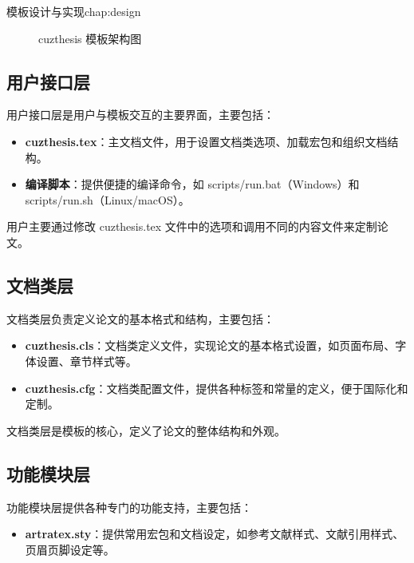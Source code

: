 \begin{cuzchapter}{模板设计与实现}{chap:design}
\begin{figure}[htbp]
        \caption{cuzthesis 模板架构图}
        \label{fig:architecture}
    \end{figure}

    \subsection{用户接口层}

    用户接口层是用户与模板交互的主要界面，主要包括：

    \begin{itemize}
        \item \textbf{cuzthesis.tex}：主文档文件，用于设置文档类选项、加载宏包和组织文档结构。

        \item \textbf{编译脚本}：提供便捷的编译命令，如 scripts/run.bat（Windows）和 scripts/run.sh（Linux/macOS）。
    \end{itemize}

    用户主要通过修改 cuzthesis.tex 文件中的选项和调用不同的内容文件来定制论文。

    \subsection{文档类层}

    文档类层负责定义论文的基本格式和结构，主要包括：

    \begin{itemize}
        \item \textbf{cuzthesis.cls}：文档类定义文件，实现论文的基本格式设置，如页面布局、字体设置、章节样式等。

        \item \textbf{cuzthesis.cfg}：文档类配置文件，提供各种标签和常量的定义，便于国际化和定制。
    \end{itemize}

    文档类层是模板的核心，定义了论文的整体结构和外观。

    \subsection{功能模块层}

    功能模块层提供各种专门的功能支持，主要包括：

    \begin{itemize}
        \item \textbf{artratex.sty}：提供常用宏包和文档设定，如参考文献样式、文献引用样式、页眉页脚设定等。


\end{itemize}
\end{cuzchapter}
